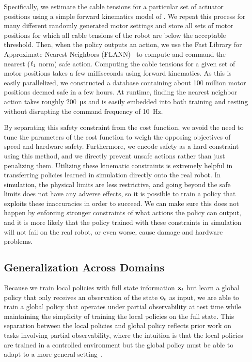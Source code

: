 Specifically, we estimate the cable tensions for a particular set of actuator
positions using a simple forward kinematics model of \SB{}.  We repeat this
process for many different randomly generated motor settings and store all sets
of motor positions for which all cable tensions of the robot are below the
acceptable threshold. Then, when the policy outputs an action, we use the Fast
Library for Approximate Nearest Neighbors (FLANN)~\cite{flannsoftware} to compute
and command the nearest ($\ell_1$ norm) safe action. Computing the cable tensions
for a given set of motor positions takes a few milliseconds using forward
kinematics. As this is easily parallelized, we constructed a database containing
about 100 million motor positions deemed safe in a few hours. At runtime,
finding the nearest neighbor action takes roughly \SI{200}{\micro\second} and is
easily embedded into both training and testing without disrupting the command
frequency of \SI{10}{\hertz}.

By separating this safety constraint from the cost function, we avoid the need
to tune the parameters of the cost function to weigh the opposing objectives of
speed and hardware safety. Furthermore, we encode safety as a hard constraint
using this method, and we directly prevent unsafe actions rather than just
penalizing them. Utilizing these kinematic constraints is extremely helpful in
transferring policies learned in simulation directly onto the real robot. In
simulation, the physical limits are less restrictive, and going beyond the safe
limits does not have any adverse effects, so it is possible to train a policy
that exploits these inaccuracies in order to succeed. We can make sure this does
not happen by enforcing stronger constraints of what actions the policy can
output, and it is more likely that the policy trained with these constraints in
simulation will not fail on the real robot, or even worse, cause damage and
hardware problems.

\subsection{Generalization Across Domains}

Because we train local policies with full state information $\mathbf{x}_t$ but learn a
global policy that only receives an observation of the state $\mathbf{o}_t$ as input,
we are able to train a global policy that operates under partial observability
at test time while maintaining the simplicity of training the local policies on
the full state. This separation between the local policies and global policy
reflects prior work on tasks involving partial observability, where the
intuition is that the local policies are trained in a controlled environment but
the global policy must be able to adapt to a more general
setting~\cite{lfda-eetdv-16}.

